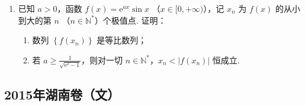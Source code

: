 \begin{description}
\begin{enumerate}[leftmargin=5pt]
\begin{enumerate}
\item 求 \(C_{2}\) 的方程；
\item 过点 \(F\) 的直线 \(l\) 与 \(C_1\) 相交于 \(A\)，\(B\) 两点，与 \(C_2\) 相交于 \(C\)，\(D\) 两点，且 \(\overrightarrow{AC}\) 与 \(\overrightarrow{BD}\) 同向.
\begin{enumerate}
\item 若 \( |AC| = |BD| \)，求直线 \( l \) 的斜率；
\item 设 \(C_1\) 在点 \(A\) 处的切线与 \(x\) 轴的交点为 \(M\)，证明： 直线 \(l\) 绕点 \(F\) 旋转时，\(\triangle MFD\) 总是钝角三角形.
\end{enumerate}
\end{enumerate}

        \item 已知 \(a > 0\)，函数 \(f(x) = {\mathrm{e}}^{ax}\sin x\) （\(x \in [0, +\infty)\)），记 \(x_n\) 为 \(f(x)\) 的从小到大的第 \(n\) （\(n \in \mathbb{N}^*\)）个极值点. 证明：

\begin{enumerate}
\item 数列 \( \left\{f(x_{n})\right\} \) 是等比数列；
\item 若 \(a \geqslant \frac{1}{\sqrt{{\mathrm{e}}^{2} - 1}}\)，则对一切 \(n \in \mathbb{N}^*\)，\(x_n < |f(x_n)|\) 恒成立.
\end{enumerate}

    \end{enumerate}

\end{description}


\subsection{2015年湖南卷（文）}\label{gk:2015年湖南卷（文）}

